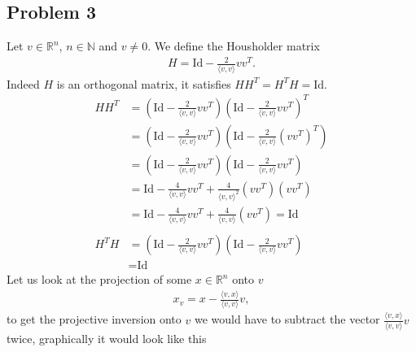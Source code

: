 \subsection{Problem 3}
Let $v \in \mathbb{R}^n$, $n \in \mathbb{N}$ and $v \neq 0$. We define the Housholder
matrix
\begin{align}
    H = \text{Id} - \frac{2}{\langle v, v \rangle}v v^T.
\end{align}
Indeed $H$ is an orthogonal matrix, it satisfies $H H^T = H^T H = \text{Id}$.
\begin{align}
    H H^T
    &=
    \left( \text{Id} - \frac{2}{\langle v, v \rangle}vv^T\right)
    \left( \text{Id} - \frac{2}{\langle v, v \rangle}vv^T\right)^T\\
    &=
    \left( \text{Id} - \frac{2}{\langle v, v \rangle}vv^T\right)
    \left( \text{Id} - \frac{2}{\langle v, v \rangle}(vv^T)^T\right)\\
    &=
    \left( \text{Id} - \frac{2}{\langle v, v \rangle}vv^T\right)
    \left( \text{Id} - \frac{2}{\langle v, v \rangle}vv^T\right)\\
    &= \text{Id} - \frac{4}{\langle v, v \rangle} vv^T + \frac{4}{\langle v,
    v \rangle^2} (v v^T)(v v^T)\\
    &= \text{Id} - \frac{4}{\langle v, v \rangle} vv^T + \frac{4}{\langle v,
    v \rangle} (v v^T) = \text{Id}
    \\
    \nonumber\\
    H^T H &=
    \left( \text{Id} - \frac{2}{\langle v, v \rangle}vv^T\right)
    \left( \text{Id} - \frac{2}{\langle v, v \rangle}vv^T\right)\\
          &= \text{Id}
\end{align}
Let us look at the projection of some $x \in \mathbb{R}^n$ onto $v$
\begin{align}
    x_v = x - \frac{\langle v,  x \rangle}{\langle v, v \rangle} v,
\end{align}
to get the projective inversion onto $v$ we would have to subtract the vector
$\frac{\langle v, x \rangle}{\langle v, v \rangle} v$ twice, graphically it would look like this
\begin{figure}[H]
    \centering
\end{figure}
